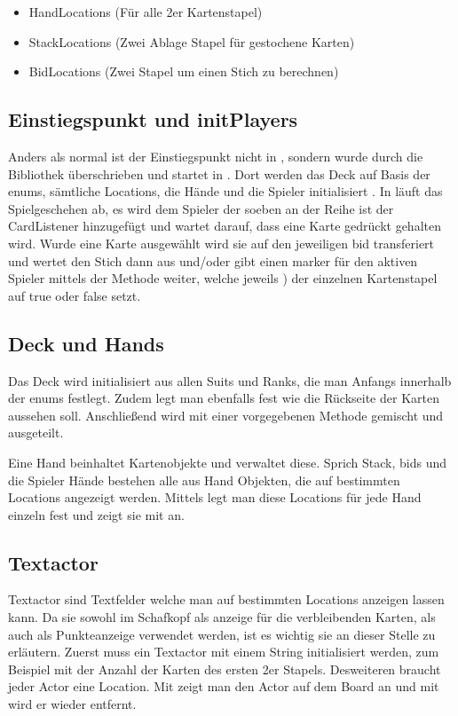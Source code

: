 \begin{itemize}
\item HandLocations (Für alle 2er Kartenstapel)
\item StackLocations (Zwei Ablage Stapel für gestochene Karten)
\item BidLocations (Zwei Stapel um einen Stich zu berechnen)
\end{itemize}

\subsection{Einstiegspunkt und initPlayers}

Anders als normal ist der Einstiegspunkt nicht in , sondern wurde
durch die Bibliothek überschrieben und startet in . Dort werden das Deck
auf Basis der enums, sämtliche Locations, die Hände und die Spieler
initialisiert . In  läuft das Spielgeschehen ab, es wird dem
Spieler der soeben an der Reihe ist der CardListener hinzugefügt und
 wartet darauf, dass eine Karte gedrückt gehalten wird.
Wurde eine Karte ausgewählt wird sie auf den jeweiligen bid transferiert und
 wertet den Stich dann aus und/oder gibt einen marker für den aktiven
Spieler mittels der Methode  weiter, welche jeweils
) der einzelnen Kartenstapel auf true oder false setzt.

\subsection{Deck und Hands}

Das Deck wird initialisiert aus allen Suits und Ranks, die man Anfangs innerhalb
der enums festlegt. Zudem legt man ebenfalls fest wie die Rückseite der Karten
aussehen soll. Anschließend wird mit einer vorgegebenen Methode gemischt und
ausgeteilt.


Eine Hand beinhaltet Kartenobjekte und verwaltet diese. Sprich Stack, bids und
die Spieler Hände bestehen alle aus Hand Objekten, die auf bestimmten Locations
angezeigt werden. Mittels  legt man diese Locations für jede Hand
einzeln fest und zeigt sie mit  an.

\subsection{Textactor}

Textactor sind Textfelder welche man auf bestimmten Locations anzeigen lassen
kann. Da sie sowohl im Schafkopf als anzeige für die verbleibenden Karten, als
auch als Punkteanzeige verwendet werden, ist es wichtig sie an dieser Stelle zu
erläutern. Zuerst muss ein Textactor mit einem String initialisiert werden, zum Beispiel mit der Anzahl der Karten des ersten 2er Stapels. Desweiteren
braucht jeder Actor eine Location. Mit  zeigt man
den Actor auf dem Board an und mit  wird er wieder
entfernt.

